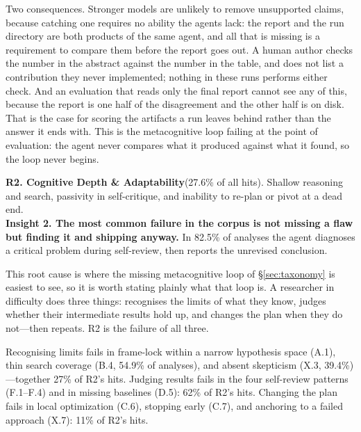 Two consequences. Stronger models are unlikely to remove unsupported claims, because
catching one requires no ability the agents lack: the report and the run
directory are both products of the same agent, and all that is missing is a
requirement to compare them before the report goes out. A human author checks
the number in the abstract against the number in the table, and does not list
a contribution they never implemented; nothing in these runs performs either
check. And an evaluation that reads only the final report cannot see any of
this, because the report is one half of the disagreement and the other half
is on disk. That is the case for scoring the artifacts a run leaves behind
rather than the answer it ends with. This is the metacognitive loop failing
at the point of evaluation: the agent never compares what it produced against
what it found, so the loop never begins.

\begin{tcolorbox}[colback=blue!3,colframe=blue!35,boxrule=0.5pt,
                  left=5pt,right=5pt,top=4pt,bottom=4pt]
\textbf{R2. Cognitive Depth \& Adaptability}\;(27.6\% of all hits). Shallow
reasoning and search, passivity in self-critique, and inability to re-plan or
pivot at a dead end.\\[3pt]
\raisebox{-1pt}{\scriptsize$\blacktriangleright$}\;\textbf{Insight 2. The
most common failure in the corpus is not missing a flaw but finding it and
shipping anyway.} In 82.5\% of analyses the agent diagnoses a critical
problem during self-review, then reports the unrevised conclusion.
\end{tcolorbox}

\noindent This root cause is where the missing metacognitive loop of
\S\ref{sec:taxonomy} is easiest to see, so it is worth stating plainly what
that loop is. A researcher in difficulty does three things: recognises the
limits of what they know, judges whether their intermediate results hold up,
and changes the plan when they do not---then repeats. R2 is the failure of
all three.

Recognising limits fails in frame-lock within a narrow hypothesis space
(A.1), thin search coverage (B.4, 54.9\% of analyses), and absent skepticism
(X.3, 39.4\%)---together 27\% of R2's hits. Judging results fails in the four self-review patterns
(F.1--F.4) and in missing baselines (D.5): 62\% of R2's hits. Changing
the plan fails in local optimization (C.6), stopping early (C.7), and
anchoring to a failed approach (X.7): 11\% of R2's hits.

